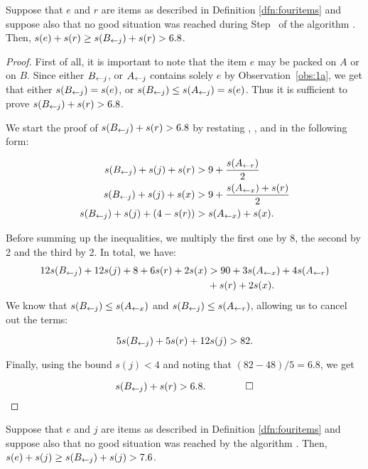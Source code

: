 \begin{lem}
Suppose that $e$ and $r$ are items as described in Definition \ref{dfn:fouritems} and suppose
also that no good situation was reached during Step~{\rm {}} of the algorithm \tbalg.
Then, $s(e) + s(r) \ge  s(B_{\leftarrow j}) + s(r) > 6.8$.
\end{lem}

\begin{proof}
First of all, it is important to note that the item $e$ may be
packed on $A$ or on $B$.
Since either $B_{\leftarrow j}$, or $A_{\leftarrow j}$ contains solely $e$
by Observation~\ref{obs:1a}, we get that either $s(B_{\leftarrow j}) = s(e)$,
or $s(B_{\leftarrow j}) \le s(A_{\leftarrow j}) = s(e)$. Thus it is sufficient to prove
$s(B_{\leftarrow j}) + s(r) > 6.8$.

We start the proof of $s(B_{\leftarrow j}) + s(r) > 6.8$ by restating , ,
and  in the following form:

\begin{align*}
s(B_{\leftarrow j}) + s(j) + s(r) &> 9 + \frac{s(A_{\leftarrow r})}{2} \\
s(B_{\leftarrow j}) + s(j) + s(x) &> 9 + \frac{s(A_{\leftarrow x}) + s(r)}{2} \\
s(B_{\leftarrow j}) + s(j) + (4 - s(r)) &> s(A_{\leftarrow x}) + s(x). 
\end{align*}

Before summing up the inequalities, we multiply the first one by 8, the
second by 2 and the third by 2. %
In total, we have:
\begin{align*}
12s(B_{\leftarrow j}) + 12s(j) + 8 + 6s(r) + 2s(x) &> 90 + 3s(A_{\leftarrow x}) + 4s(A_{\leftarrow r})\\
&+ s(r) + 2s(x). \\
\end{align*}
We know that $s(B_{\leftarrow j}) \leq s(A_{\leftarrow x})$ and $s(B_{\leftarrow j}) \leq s(A_{\leftarrow r})$, allowing us to cancel out the terms:

\[ 5s(B_{\leftarrow j}) + 5s(r) + 12s(j) > 82. \]

Finally, using the bound $s(j) < 4$ and noting that $(82 - 48)/5 = 6.8$, we get

\[ s(B_{\leftarrow j}) + s(r) > 6.8. \qquad \qed\]
\end{proof}

\begin{lem}
Suppose that $e$ and $j$ are items as described in Definition \ref{dfn:fouritems} and suppose
also that no good situation was reached by the algorithm \tbalg.
Then, $s(e) + s(j) \ge  s(B_{\leftarrow j}) + s(j) > 7.6$.
\end{lem}

